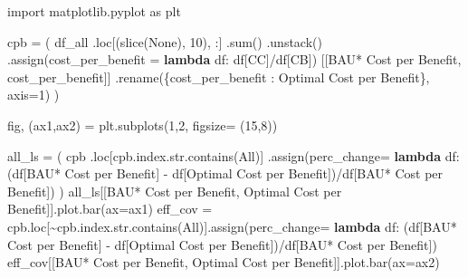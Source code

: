 \documentclass[
]{article}
\newenvironment{Shaded}{}{}
\newcommand{\BuiltInTok}[1]{#1}
\newcommand{\DecValTok}[1]{\textcolor[rgb]{0.25,0.63,0.44}{#1}}
\newcommand{\ImportTok}[1]{#1}
\newcommand{\KeywordTok}[1]{\textcolor[rgb]{0.00,0.44,0.13}{\textbf{#1}}}
\newcommand{\NormalTok}[1]{#1}
\newcommand{\OperatorTok}[1]{\textcolor[rgb]{0.40,0.40,0.40}{#1}}
\newcommand{\StringTok}[1]{\textcolor[rgb]{0.25,0.44,0.63}{#1}}
\newcommand{\VariableTok}[1]{\textcolor[rgb]{0.10,0.09,0.49}{#1}}
\begin{document}
\begin{Shaded}
\begin{Highlighting}[numbers=left,,firstnumber=113,]
\ImportTok{import}\NormalTok{ matplotlib.pyplot }\ImportTok{as}\NormalTok{ plt}

\NormalTok{cpb }\OperatorTok{=}\NormalTok{ (}
\NormalTok{    df\_all}
\NormalTok{    .loc[(}\BuiltInTok{slice}\NormalTok{(}\VariableTok{None}\NormalTok{), }\DecValTok{10}\NormalTok{), :]}
\NormalTok{    .}\BuiltInTok{sum}\NormalTok{()}
\NormalTok{    .unstack()}
\NormalTok{    .assign(cost\_per\_benefit }\OperatorTok{=} \KeywordTok{lambda}\NormalTok{ df: df[}\StringTok{\textquotesingle{}CC\textquotesingle{}}\NormalTok{]}\OperatorTok{/}\NormalTok{df[}\StringTok{\textquotesingle{}CB\textquotesingle{}}\NormalTok{])}
\NormalTok{    [[}\StringTok{\textquotesingle{}BAU* Cost per Benefit\textquotesingle{}}\NormalTok{, }\StringTok{\textquotesingle{}cost\_per\_benefit\textquotesingle{}}\NormalTok{]]}
\NormalTok{    .rename(\{}\StringTok{\textquotesingle{}cost\_per\_benefit\textquotesingle{}}\NormalTok{ : }\StringTok{\textquotesingle{}Optimal Cost per Benefit\textquotesingle{}}\NormalTok{\}, axis}\OperatorTok{=}\DecValTok{1}\NormalTok{)}
\NormalTok{    )}

\NormalTok{fig, (ax1,ax2) }\OperatorTok{=}\NormalTok{ plt.subplots(}\DecValTok{1}\NormalTok{,}\DecValTok{2}\NormalTok{, figsize}\OperatorTok{=}\NormalTok{ (}\DecValTok{15}\NormalTok{,}\DecValTok{8}\NormalTok{))}

\NormalTok{all\_ls }\OperatorTok{=}\NormalTok{ (}
\NormalTok{    cpb}
\NormalTok{    .loc[cpb.index.}\BuiltInTok{str}\NormalTok{.contains(}\StringTok{\textquotesingle{}All\textquotesingle{}}\NormalTok{)]}
\NormalTok{    .assign(perc\_change}\OperatorTok{=} \KeywordTok{lambda}\NormalTok{ df: (df[}\StringTok{\textquotesingle{}BAU* Cost per Benefit\textquotesingle{}}\NormalTok{] }\OperatorTok{{-}}\NormalTok{ df[}\StringTok{\textquotesingle{}Optimal Cost per Benefit\textquotesingle{}}\NormalTok{])}\OperatorTok{/}\NormalTok{df[}\StringTok{\textquotesingle{}BAU* Cost per Benefit\textquotesingle{}}\NormalTok{])}
\NormalTok{    )}
\NormalTok{all\_ls[[}\StringTok{\textquotesingle{}BAU* Cost per Benefit\textquotesingle{}}\NormalTok{, }\StringTok{\textquotesingle{}Optimal Cost per Benefit\textquotesingle{}}\NormalTok{]].plot.bar(ax}\OperatorTok{=}\NormalTok{ax1)}
\NormalTok{eff\_cov }\OperatorTok{=}\NormalTok{ cpb.loc[}\OperatorTok{\textasciitilde{}}\NormalTok{cpb.index.}\BuiltInTok{str}\NormalTok{.contains(}\StringTok{\textquotesingle{}All\textquotesingle{}}\NormalTok{)].assign(perc\_change}\OperatorTok{=} \KeywordTok{lambda}\NormalTok{ df: (df[}\StringTok{\textquotesingle{}BAU* Cost per Benefit\textquotesingle{}}\NormalTok{] }\OperatorTok{{-}}\NormalTok{ df[}\StringTok{\textquotesingle{}Optimal Cost per Benefit\textquotesingle{}}\NormalTok{])}\OperatorTok{/}\NormalTok{df[}\StringTok{\textquotesingle{}BAU* Cost per Benefit\textquotesingle{}}\NormalTok{])}
\NormalTok{eff\_cov[[}\StringTok{\textquotesingle{}BAU* Cost per Benefit\textquotesingle{}}\NormalTok{, }\StringTok{\textquotesingle{}Optimal Cost per Benefit\textquotesingle{}}\NormalTok{]].plot.bar(ax}\OperatorTok{=}\NormalTok{ax2)}


\end{Highlighting}
\end{Shaded}
\end{document}
